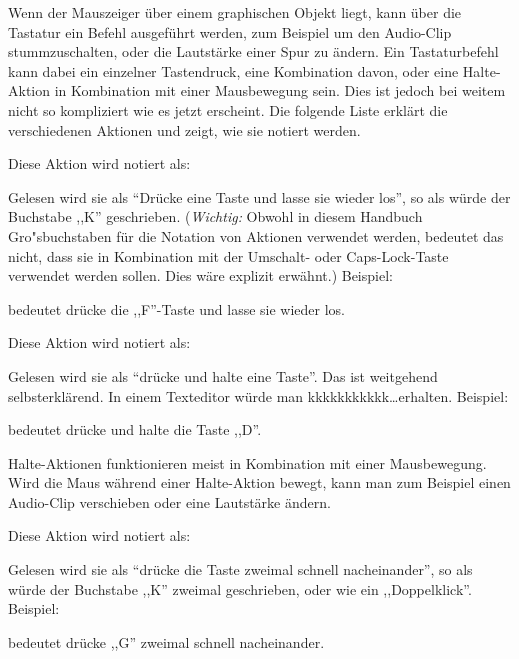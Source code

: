 Wenn der Mauszeiger über einem graphischen Objekt liegt, kann über die Tastatur ein Befehl ausgeführt werden, zum Beispiel um den Audio-Clip stummzuschalten, oder die Lautstärke einer Spur zu ändern. Ein Tastaturbefehl kann dabei ein einzelner Tastendruck, eine Kombination davon, oder eine Halte-Aktion in Kombination mit einer Mausbewegung sein. Dies ist jedoch bei weitem nicht so kompliziert wie es jetzt erscheint. Die folgende Liste erklärt die verschiedenen Aktionen und zeigt, wie sie notiert werden.

Diese Aktion wird notiert als:
\begin{quotation}
\end{quotation}
Gelesen wird sie als ``Drücke eine Taste und lasse sie wieder los'', so als würde der Buchstabe ,,K'' geschrieben. (\emph{Wichtig:} Obwohl in diesem Handbuch Gro"sbuchstaben für die Notation von Aktionen verwendet werden, bedeutet das nicht, dass sie in Kombination mit der Umschalt- oder Caps-Lock-Taste verwendet werden sollen. Dies wäre explizit erwähnt.) Beispiel:
\begin{quotation}
\end{quotation}
bedeutet drücke die ,,F''-Taste und lasse sie wieder los.

Diese Aktion wird notiert als:
\begin{quotation}
\end{quotation}
Gelesen wird sie als ``drücke und halte eine Taste''. Das ist weitgehend selbsterklärend. In einem Texteditor würde man kkkkkkkkkkk\dots erhalten.
Beispiel:
\begin{quotation}
\end{quotation}
bedeutet drücke und halte die Taste ,,D''.

Halte-Aktionen funktionieren meist in Kombination mit einer Mausbewegung. Wird die Maus während einer Halte-Aktion bewegt, kann man zum Beispiel einen Audio-Clip verschieben oder eine Lautstärke ändern.


Diese Aktion wird notiert als:
\begin{quotation}
\end{quotation}
Gelesen wird sie als ``drücke die Taste zweimal schnell nacheinander'', so als würde der Buchstabe ,,K'' zweimal geschrieben, oder wie ein ,,Doppelklick''. Beispiel:
\begin{quotation}
\end{quotation}
bedeutet drücke ,,G'' zweimal schnell nacheinander.

